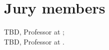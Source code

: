 
\chapter*{Jury members}


\noindent \textsc{TBD}, Professor at ;\\

\noindent \textsc{TBD}, Professor at . \\
